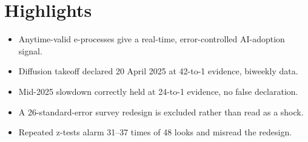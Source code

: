 \documentclass{article}
\begin{document}
\section*{Highlights}
\begin{itemize}
\item Anytime-valid e-processes give a real-time, error-controlled AI-adoption signal.
\item Diffusion takeoff declared 20 April 2025 at 42-to-1 evidence, biweekly data.
\item Mid-2025 slowdown correctly held at 24-to-1 evidence, no false declaration.
\item A 26-standard-error survey redesign is excluded rather than read as a shock.
\item Repeated z-tests alarm 31--37 times of 48 looks and misread the redesign.
\end{itemize}
\end{document}

